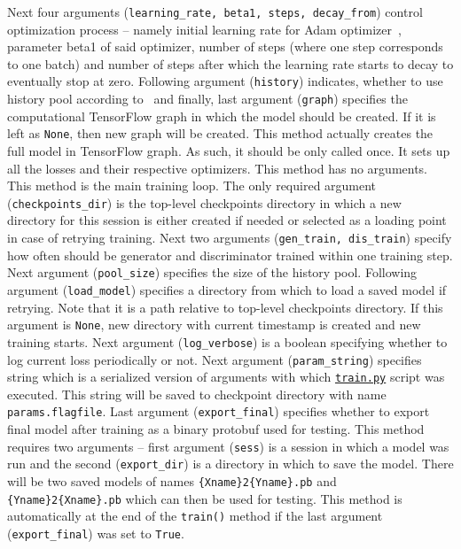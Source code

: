 \begin{itemize}
\begin{description}
Next four arguments (\texttt{learning\_rate, beta1, steps, decay\_from}) control optimization process -- namely initial learning rate for Adam optimizer~\cite{adam}, parameter beta1 of said optimizer, number of steps (where one step corresponds to one batch) and number of steps after which the learning rate starts to decay to eventually stop at zero. Following argument (\texttt{history}) indicates, whether to use history pool according to~\cite{historypool} and finally, last argument (\texttt{graph}) specifies the computational TensorFlow graph in which the model should be created. If it is left as \texttt{None}, then new graph will be created.
 This method actually creates the full model in TensorFlow graph. As such, it should be only called once. It sets up all the losses and their respective optimizers. This method has no arguments.
 This method is the main training loop. The only required argument (\texttt{checkpoints\_dir}) is the top-level checkpoints directory in which a new directory for this session is either created if needed or selected as a loading point in case of retrying training. Next two arguments (\texttt{gen\_train, dis\_train}) specify how often should be generator and discriminator trained within one training step. Next argument (\texttt{pool\_size}) specifies the size of the history pool. Following argument (\texttt{load\_model}) specifies a directory from which to load a saved model if retrying. Note that it is a path relative to top-level checkpoints directory. If this argument is \texttt{None}, new directory with current timestamp is created and new training starts. Next argument (\texttt{log\_verbose}) is a boolean specifying whether to log current loss periodically or not. Next argument (\texttt{param\_string}) specifies string which is a serialized version of arguments with which \hyperref[trainpy]{\texttt{train.py}} script was executed. This string will be saved to checkpoint directory with name \texttt{params.flagfile}. Last argument (\texttt{export\_final}) specifies whether to export final model after training as a binary protobuf used for testing.
 This method requires two arguments -- first argument (\texttt{sess}) is a session in which a model was run and the second (\texttt{export\_dir}) is a directory in which to save the model. There will be two saved models of names \texttt{\{Xname\}2\{Yname\}.pb} and \texttt{\{Yname\}2\{Xname\}.pb} which can then be used for testing. This method is automatically at the end of the \texttt{train()} method if the last argument (\texttt{export\_final}) was set to \texttt{True}.

\end{description}
\end{itemize}
